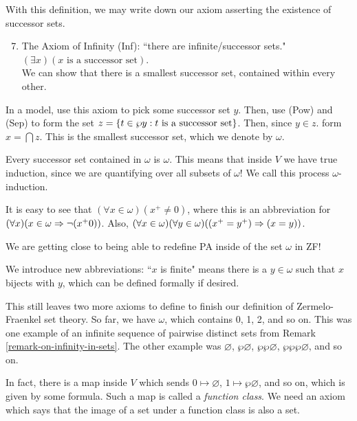 \documentclass{article}
\begin{document}
With this definition, we may write down our axiom asserting the existence of successor sets.

\begin{enumerate}
	\setcounter{enumi}{6}
    \item The Axiom of Infinity (Inf): ``there are infinite/successor sets." \\
    $(\exists x)(x \text{ is a successor set})$. \\
    We can show that there is a smallest successor set, contained within every other.
\end{enumerate}

\begin{corollary}
    In a model, use this axiom to pick some successor set $y$. Then, use (Pow) and (Sep) to form the set $z = \left\lbrace t \in \wp y : t \text{ is a successor set} \right\rbrace$. Then, since $y \in z$. form $x = \bigcap z$. This is the smallest successor set, which we denote by $\omega$.
\end{corollary}

Every successor set contained in $\omega$ is $\omega$. This means that inside $V$ we have true induction, since we are quantifying over all subsets of $\omega$! We call this process $\omega$-induction.

It is easy to see that $(\forall x \in \omega)(x^+ \neq 0)$, where this is an abbreviation for $(\forall x)(x \in \omega \Rightarrow \lnot(x^+  0))$. Also, $(\forall x \in \omega)(\forall y \in \omega)((x^+ = y^+) \Rightarrow (x = y))$.

We are getting close to being able to redefine PA inside of the set $\omega$ in ZF!

We introduce new abbreviations: ``$x$ is finite" means there is a $y \in \omega$ such that $x$ bijects with $y$, which can be defined formally if desired.

This still leaves two more axioms to define to finish our definition of Zermelo-Fraenkel set theory. So far, we have $\omega$, which contains 0, 1, 2, and so on. This was one example of an infinite sequence of pairwise distinct sets from Remark \ref{remark-on-infinity-in-sets}. The other example was $\varnothing$, $\wp\varnothing$, $\wp\wp\varnothing$, $\wp\wp\wp\varnothing$, and so on.

In fact, there is a map inside $V$ which sends $0 \mapsto \varnothing$, $1 \mapsto \wp\varnothing$, and so on, which is given by some formula. Such a map is called a \textit{function class}. We need an axiom which says that the image of a set under a function class is also a set.
\end{document}
